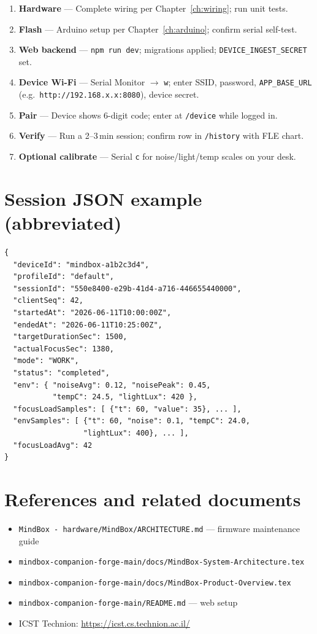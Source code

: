 \documentclass[11pt,a4paper]{report}
\newcommand{\filepath}[1]{\texttt{#1}}
\begin{document}
\begin{enumerate}[leftmargin=*]
  \item \textbf{Hardware} --- Complete wiring per Chapter~\ref{ch:wiring}; run unit tests.
  \item \textbf{Flash} --- Arduino setup per Chapter~\ref{ch:arduino}; confirm serial self-test.
  \item \textbf{Web backend} --- \texttt{npm run dev}; migrations applied; \texttt{DEVICE\_INGEST\_SECRET} set.
  \item \textbf{Device Wi-Fi} --- Serial Monitor $\rightarrow$ \texttt{w}; enter SSID, password,
        \texttt{APP\_BASE\_URL} (e.g.\ \texttt{http://192.168.x.x:8080}), device secret.
  \item \textbf{Pair} --- Device shows 6-digit code; enter at \texttt{/device} while logged in.
  \item \textbf{Verify} --- Run a 2--3\,min session; confirm row in \texttt{/history} with FLE chart.
  \item \textbf{Optional calibrate} --- Serial \texttt{c} for noise/light/temp scales on your desk.
\end{enumerate}

\chapter{Session JSON example (abbreviated)}

\begin{lstlisting}
{
  "deviceId": "mindbox-a1b2c3d4",
  "profileId": "default",
  "sessionId": "550e8400-e29b-41d4-a716-446655440000",
  "clientSeq": 42,
  "startedAt": "2026-06-11T10:00:00Z",
  "endedAt": "2026-06-11T10:25:00Z",
  "targetDurationSec": 1500,
  "actualFocusSec": 1380,
  "mode": "WORK",
  "status": "completed",
  "env": { "noiseAvg": 0.12, "noisePeak": 0.45,
           "tempC": 24.5, "lightLux": 420 },
  "focusLoadSamples": [ {"t": 60, "value": 35}, ... ],
  "envSamples": [ {"t": 60, "noise": 0.1, "tempC": 24.0,
                  "lightLux": 400}, ... ],
  "focusLoadAvg": 42
}
\end{lstlisting}

\chapter{References and related documents}

\begin{itemize}[leftmargin=*]
  \item \filepath{MindBox - hardware/MindBox/ARCHITECTURE.md} --- firmware maintenance guide
  \item \filepath{mindbox-companion-forge-main/docs/MindBox-System-Architecture.tex}
  \item \filepath{mindbox-companion-forge-main/docs/MindBox-Product-Overview.tex}
  \item \filepath{mindbox-companion-forge-main/README.md} --- web setup
  \item ICST Technion: \url{https://icst.cs.technion.ac.il/}
\end{itemize}
\end{document}
